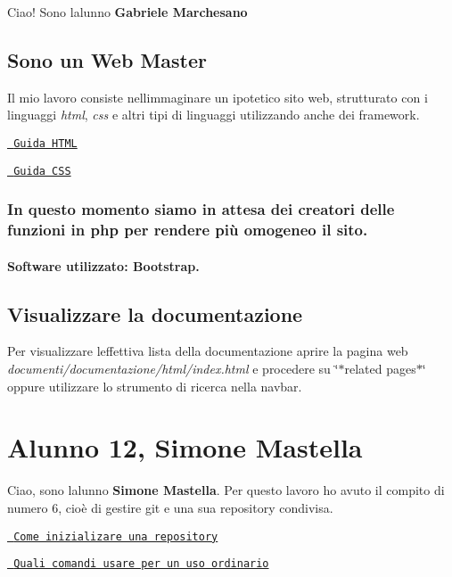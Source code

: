 Ciao! Sono l\textquotesingle{}alunno {\bfseries{Gabriele Marchesano}} \subsection*{Sono un Web Master}

Il mio lavoro consiste nell\textquotesingle{}immaginare un ipotetico sito web, strutturato con i linguaggi {\itshape html}, {\itshape css} e altri tipi di linguaggi utilizzando anche dei framework.

\href{https://www.w3schools.com/html/}{\texttt{ Guida H\+T\+ML}}

\href{https://www.w3schools.com/css/}{\texttt{ Guida C\+SS}}

\subsubsection*{In questo momento siamo in attesa dei creatori delle funzioni in php per rendere più omogeneo il sito.}

\paragraph*{Software utilizzato\+: Bootstrap.}

\subsection*{Visualizzare la documentazione}

Per visualizzare l\textquotesingle{}effettiva lista della documentazione aprire la pagina web {\itshape documenti/documentazione/html/index.\+html} e procedere su \char`\"{}$\ast$related pages$\ast$\char`\"{} oppure utilizzare lo strumento di ricerca nella navbar.

\section*{Alunno 12, Simone Mastella}

Ciao, sono l\textquotesingle{}alunno {\bfseries{Simone Mastella}}. Per questo lavoro ho avuto il compito di numero 6, cioè di gestire git e una sua repository condivisa.

\href{https://gist.github.com/simonemastella/1792e8dd3cc8a8878825a4d2df676300}{\texttt{ Come inizializare una repository}}

\href{https://gist.github.com/simonemastella/90364ec267d65a5328bd97c23aee1864}{\texttt{ Quali comandi usare per un uso ordinario}}

